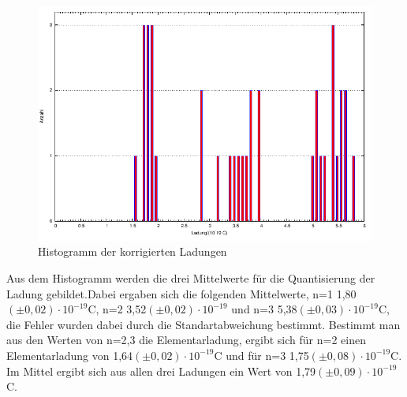 \documentclass[12pt]{scrartcl}
\begin{document}
\begin{figure}[H] 
  \centering
    \includegraphics[scale = 1.3]{messung.pdf}
  	\caption[Histogramm der korrigierten Ladungen]{Histogramm der korrigierten Ladungen}
  \label{fig:histogramm}
\end{figure}

Aus dem Histogramm werden die drei Mittelwerte für die Quantisierung der Ladung gebildet.Dabei ergaben sich die folgenden Mittelwerte, n=1 \hspace*{4px} 1,80$(\pm0,02)\cdot 10^{-19}$C, n=2 \hspace*{4px} 3,52$(\pm 0,02)\cdot 10^{-19}$ und n=3 \hspace*{4px} 5,38$(\pm 0,03)\cdot 10^{-19}$C, die Fehler wurden dabei durch die Standartabweichung bestimmt. Bestimmt man aus den Werten von n=2,3 die Elementarladung, ergibt sich für n=2 einen Elementarladung von 1,64$(\pm 0,02)\cdot 10^{-19}$C und für n=3 \hspace*{4px} 1,75$(\pm 0,08)\cdot 10^{-19}$C.
Im Mittel ergibt sich aus allen drei Ladungen ein Wert von 1,79$(\pm 0,09)\cdot 10^{-19}$C.
\end{document}
